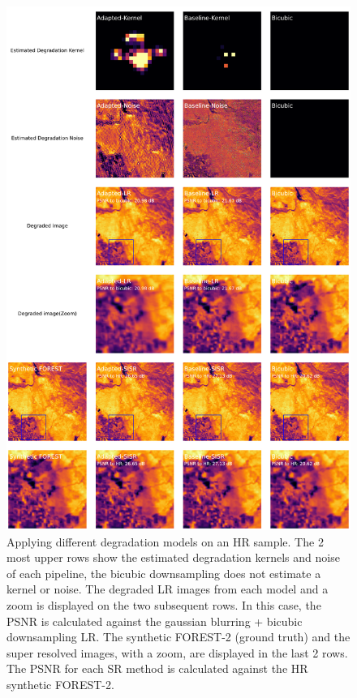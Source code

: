         
        \begin{figure}[H]
            \centering
            \includegraphics[width=\textwidth]{Includes/5-source-prediction-sample.pdf}
            \caption{Applying different degradation models on an HR sample. 
                     The 2 most upper rows show the estimated degradation kernels and noise of each pipeline, the bicubic downsampling does not estimate a kernel or noise.
                     The degraded LR images from each model and a zoom is displayed on the two subsequent rows. 
                     In this case, the PSNR is calculated against the gaussian blurring + bicubic downsampling LR.
                     The synthetic FOREST-2 (ground truth) and the super resolved images, with a zoom, are displayed in the last 2 rows. 
                     The PSNR for each SR method is calculated against the HR synthetic FOREST-2.
            }
            \label{fig:5-source_domain_sample}
        \end{figure}


